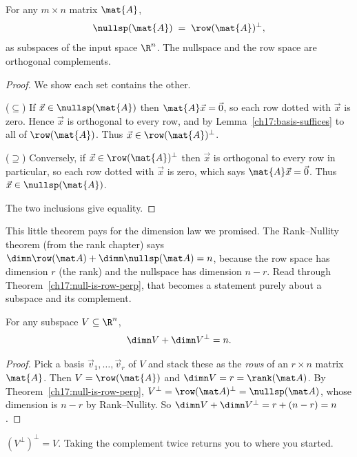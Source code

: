 \begin{theorem}\label{ch17:null-is-row-perp}
For any $m\times n$ matrix $\mat{A}$,
\[
  \nullsp(\mat{A}) \;=\; \row(\mat{A})^{\perp},
\]
as subspaces of the input space $\R^n$. The nullspace and the row space are orthogonal
complements.
\end{theorem}

\begin{proof}
We show each set contains the other.

($\subseteq$) If $\vec{x}\in\nullsp(\mat{A})$ then $\mat{A}\vec{x}=\vec{0}$, so each row dotted
with $\vec{x}$ is zero. Hence $\vec{x}$ is orthogonal to every row, and by
Lemma~\ref{ch17:basis-suffices} to all of $\row(\mat{A})$. Thus $\vec{x}\in\row(\mat{A})^\perp$.

($\supseteq$) Conversely, if $\vec{x}\in\row(\mat{A})^\perp$ then $\vec{x}$ is orthogonal to every
row in particular, so each row dotted with $\vec{x}$ is zero, which says $\mat{A}\vec{x}=\vec{0}$.
Thus $\vec{x}\in\nullsp(\mat{A})$.

The two inclusions give equality.
\end{proof}

This little theorem pays for the dimension law we promised. The Rank--Nullity theorem (from the
rank chapter) says $\dimn\row(\mat A)+\dimn\nullsp(\mat A)=n$, because the row space has dimension
$r$ (the rank) and the nullspace has dimension $n-r$. Read through Theorem~\ref{ch17:null-is-row-perp},
that becomes a statement purely about a subspace and its complement.

\begin{theorem}\label{ch17:dim-complement}
For any subspace $V\subseteq\R^n$,
\[
  \dimn V + \dimn V^{\perp} = n.
\]
\end{theorem}

\begin{proof}
Pick a basis $\vec{v}_1,\dots,\vec{v}_r$ of $V$ and stack these as the \emph{rows} of an
$r\times n$ matrix $\mat{A}$. Then $V=\row(\mat{A})$ and $\dimn V=r=\rank(\mat A)$. By
Theorem~\ref{ch17:null-is-row-perp}, $V^\perp=\row(\mat A)^\perp=\nullsp(\mat A)$, whose dimension
is $n-r$ by Rank--Nullity. So $\dimn V+\dimn V^\perp = r+(n-r)=n$.
\end{proof}

\begin{corollary}\label{ch17:perp-perp}
$(V^\perp)^\perp = V$. Taking the complement twice returns you to where you started.
\end{corollary}

